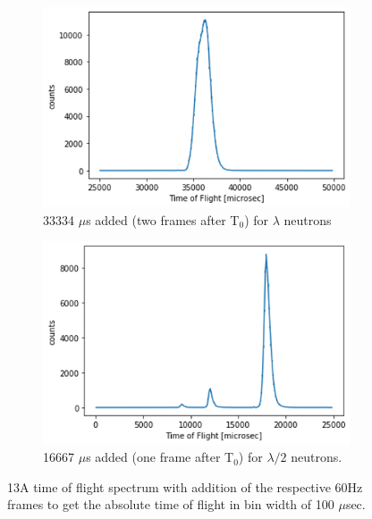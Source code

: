 {\begin{figure}
\centering
  \begin{subfigure}[b]{0.49\textwidth}
    \includegraphics[width=\textwidth]{chop_frameadd_2.png}
    \caption{33334 $\mu$s added (two frames after T$_0$) for $\lambda$ neutrons}
    \label{fig:frame2}
  \end{subfigure}
  \hfill
  \begin{subfigure}[b]{0.49\textwidth}
    \includegraphics[width=\textwidth]{chop_frameadd_1.png}
    \caption{16667 $\mu$s added (one frame after T$_0$) for $\lambda/2$ neutrons.}
    \label{fig:frame1}
  \end{subfigure}
  \caption{13A time of flight spectrum with addition of the respective 60Hz frames to get the absolute time of flight in bin width of 100 $\mu$sec.}
  \label{fig:frameadd}
\end{figure}
\clearpage}


